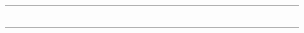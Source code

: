 \begin{table}[htbp]
{\begin{tabular}{rrrrrrrrrrrrrrrrrrrrrrrrrrrrrrrrrrr}
 &  &  &  &  &  &  &  &  &  &  &  &  &  &  &  &  &  &  &  &  &  &  &  &  &  &  &  &  &  &  &  &  &  &  \\
 &  &  &  &  &  &  &  &  &  &  &  &  &  &  &  &  &  &  &  &  &  &  &  &  &  &  &  &  &  &  &  &  &  &  \\
 &  &  &  &  &  &  &  &  &  &  &  &  &  &  &  &  &  &  &  &  &  &  &  &  &  &  &  &  &  &  &  &  &  &  \\
 &  &  &  &  &  &  &  &  &  &  &  &  &  &  &  &  &  &  &  &  &  &  &  &  &  &  &  &  &  &  &  &  &  &  \\
 &  &  &  &  &  &  &  &  &  &  &  &  &  &  &  &  &  &  &  &  &  &  &  &  &  &  &  &  &  &  &  &  &  &  \\
 &  &  &  &  &  &  &  &  &  &  &  &  &  &  &  &  &  &  &  &  &  &  &  &  &  &  &  &  &  &  &  &  &  &  \\
 &  &  &  &  &  &  &  &  &  &  &  &  &  &  &  &  &  &  &  &  &  &  &  &  &  &  &  &  &  &  &  &  &  &  \\

\end{tabular}}
\end{table}
